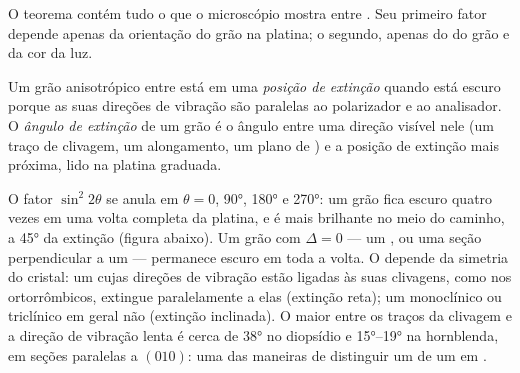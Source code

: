 O teorema contém tudo o que o microscópio mostra entre . Seu primeiro fator depende apenas da orientação do grão na platina; o segundo, apenas do  do grão e da cor da luz.

\begin{definition}\label{def:b1:optical-mineralogy:extinction}
Um grão anisotrópico entre  está em uma \emph{posição de extinção} quando está escuro porque as suas direções de vibração são paralelas ao polarizador e ao analisador. O \emph{ângulo de extinção} de um grão é o ângulo entre uma direção visível nele (um traço de clivagem, um alongamento, um plano de ) e a posição de extinção mais próxima, lido na platina graduada.
\end{definition}

O fator $\sin^2 2\theta$ se anula em $\theta = 0$, \ang{90}, \ang{180} e \ang{270}: um grão fica escuro quatro vezes em uma volta completa da platina, e é mais brilhante no meio do caminho, a \ang{45} da extinção (figura abaixo). Um grão com $\Delta = 0$ --- um , ou uma seção perpendicular a um  --- permanece escuro em toda a volta. O  depende da simetria do cristal: um  cujas direções de vibração estão ligadas às suas clivagens, como nos  ortorrômbicos, extingue paralelamente a elas (extinção reta); um monoclínico ou triclínico em geral não (extinção inclinada). O maior  entre os traços da clivagem e a direção de vibração lenta é cerca de \ang{38} no diopsídio e \ang{15}--\ang{19} na hornblenda, em seções paralelas a $(010)$: uma das maneiras de distinguir um  de um  em .

